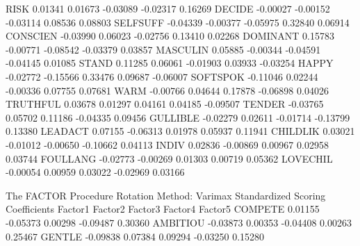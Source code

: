 \documentclass{article}
\begin{document}
\begin{Woutput}
RISK             0.01341         0.01673        -0.03089        -0.02317         0.16269
DECIDE          -0.00027        -0.00152        -0.03114         0.08536         0.08803
SELFSUFF        -0.04339        -0.00377        -0.05975         0.32840         0.06914
CONSCIEN        -0.03990         0.06023        -0.02756         0.13410         0.02268
DOMINANT         0.15783        -0.00771        -0.08542        -0.03379         0.03857
MASCULIN         0.05885        -0.00344        -0.04591        -0.04145         0.01085
STAND            0.11285         0.06061        -0.01903         0.03933        -0.03254
HAPPY           -0.02772        -0.15566         0.33476         0.09687        -0.06007
SOFTSPOK        -0.11046         0.02244        -0.00336         0.07755         0.07681
WARM            -0.00766         0.04644         0.17878        -0.06898         0.04026
TRUTHFUL         0.03678         0.01297         0.04161         0.04185        -0.09507
TENDER          -0.03765         0.05702         0.11186        -0.04335         0.09456
GULLIBLE        -0.02279         0.02611        -0.01714        -0.13799         0.13380
LEADACT          0.07155        -0.06313         0.01978         0.05937         0.11941
CHILDLIK         0.03021        -0.01012        -0.00650        -0.10662         0.04113
INDIV            0.02836        -0.00869         0.00967         0.02958         0.03744
FOULLANG        -0.02773        -0.00269         0.01303         0.00719         0.05362
LOVECHIL        -0.00054         0.00959         0.03022        -0.02969         0.03166

The FACTOR Procedure
Rotation Method: Varimax
                           Standardized Scoring Coefficients
                 Factor1         Factor2         Factor3         Factor4         Factor5
COMPETE          0.01155        -0.05373         0.00298        -0.09487         0.30360
AMBITIOU        -0.03873         0.00353        -0.04408         0.00263         0.25467
GENTLE          -0.09838         0.07384         0.09294        -0.03250         0.15280


\end{Woutput}
\end{document}
